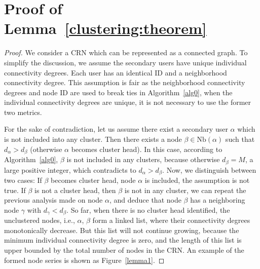 \documentclass[times]{ettauth}
\newcommand{\ie}{i.e., }
\theoremstyle{mytheoremstyle}
\theoremstyle{mytheoremstyle}
\theoremstyle{mytheoremstyle}
\begin{document}
\section{Proof of Lemma~\ref{clustering:theorem}}
\begin{proof}
\label{proof_clustering:lemma1}
We consider a CRN which can be represented as a connected graph.
To simplify the discussion, we assume the secondary users have unique individual connectivity degrees. 
Each user has an identical ID and a neighborhood connectivity degree.
This assumption is fair as the neighborhood connectivity degrees and node ID are used to break ties in Algorithm~\ref{alg0}, when the individual connectivity degrees are unique, it is not necessary to use the former two metrics. 

For the sake of contradiction, let us assume there exist a secondary user $\alpha$ which is not included into any cluster.
Then there exists a node $\beta\in \text{Nb}(\alpha)$ such that $d_{\alpha} > d_{\beta}$ (otherwise $\alpha$ becomes cluster head). 
In this case, according to Algorithm~\ref{alg0}, $\beta$ is not included in any clusters, because otherwise $d_{\beta} = M$, a large positive integer, which contradicts to $d_{\alpha} > d_{\beta}$.
Now, we distinguish between two cases: 
If $\beta$ becomes cluster head, node $\alpha$ is included, the assumption is not true.
If $\beta$ is not a cluster head, then $\beta$ is not in any cluster, we can repeat the previous analysis made on node $\alpha$, and deduce that node $\beta$ has a neighboring node $\gamma$ with $d_{\gamma} < d_{\beta}$.
So far, when there is no cluster head identified, the unclustered nodes, \ie $\alpha$, $\beta$ form a linked list, where their connectivity degrees monotonically decrease.
But this list will not continue growing, because the minimum individual connectivity degree is zero, and the length of this list is upper bounded by the total number of nodes in the CRN.
An example of the formed node series is shown as Figure~\ref{lemma1}.


\end{proof}
\end{document}
